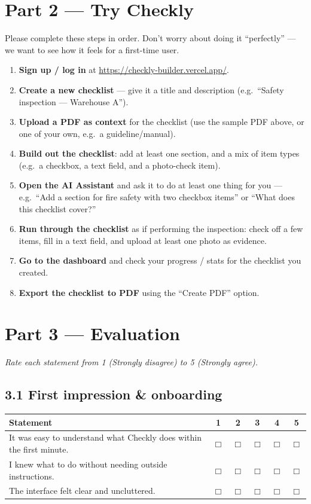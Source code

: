\documentclass[11pt,a4paper]{article}
\begin{document}
\section*{Part 2 --- Try Checkly}

Please complete these steps in order. Don't worry about doing it ``perfectly'' --- we want to see how it feels for a first-time user.

\begin{enumerate}
  \item \textbf{Sign up / log in} at \url{https://checkly-builder.vercel.app/}.
  \item \textbf{Create a new checklist} --- give it a title and description (e.g.\ ``Safety inspection --- Warehouse A'').
  \item \textbf{Upload a PDF as context} for the checklist (use the sample PDF above, or one of your own, e.g.\ a guideline/manual).
  \item \textbf{Build out the checklist}: add at least one section, and a mix of item types (e.g.\ a checkbox, a text field, and a photo-check item).
  \item \textbf{Open the AI Assistant} and ask it to do at least one thing for you --- e.g.\ ``Add a section for fire safety with two checkbox items'' or ``What does this checklist cover?''
  \item \textbf{Run through the checklist} as if performing the inspection: check off a few items, fill in a text field, and upload at least one photo as evidence.
  \item \textbf{Go to the dashboard} and check your progress / stats for the checklist you created.
  \item \textbf{Export the checklist to PDF} using the ``Create PDF'' option.
\end{enumerate}

\section*{Part 3 --- Evaluation}

\textit{Rate each statement from 1 (Strongly disagree) to 5 (Strongly agree).}

\subsection*{3.1 First impression \& onboarding}

\begin{tabularx}{\textwidth}{@{}YCCCCC@{}}
\toprule
Statement & 1 & 2 & 3 & 4 & 5\\
\midrule
It was easy to understand what Checkly does within the first minute. & $\Box$ & $\Box$ & $\Box$ & $\Box$ & $\Box$\\
I knew what to do without needing outside instructions. & $\Box$ & $\Box$ & $\Box$ & $\Box$ & $\Box$\\
The interface felt clear and uncluttered. & $\Box$ & $\Box$ & $\Box$ & $\Box$ & $\Box$\\
\bottomrule
\end{tabularx}
\end{document}
